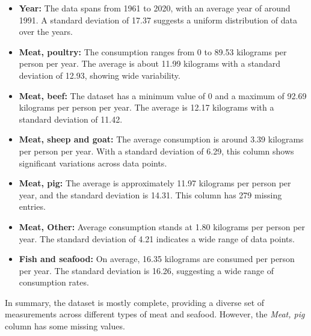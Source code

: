                 \begin{itemize}
                        \item \textbf{Year:} The data spans from 1961 to 2020, with an average year of around 1991. A standard deviation of 17.37 suggests a uniform distribution of data over the years.

                        \item \textbf{Meat, poultry:} The consumption ranges from 0 to 89.53 kilograms per person per year. The average is about 11.99 kilograms with a standard deviation of 12.93, showing wide variability.

                        \item \textbf{Meat, beef:} The dataset has a minimum value of 0 and a maximum of 92.69 kilograms per person per year. The average is 12.17 kilograms with a standard deviation of 11.42.

                        \item \textbf{Meat, sheep and goat:} The average consumption is around 3.39 kilograms per person per year. With a standard deviation of 6.29, this column shows significant variations across data points.

                        \item \textbf{Meat, pig:} The average is approximately 11.97 kilograms per person per year, and the standard deviation is 14.31. This column has 279 missing entries.

                        \item \textbf{Meat, Other:} Average consumption stands at 1.80 kilograms per person per year. The standard deviation of 4.21 indicates a wide range of data points.

                        \item \textbf{Fish and seafood:} On average, 16.35 kilograms are consumed per person per year. The standard deviation is 16.26, suggesting a wide range of consumption rates.
                \end{itemize}

                In summary, the dataset is mostly complete, providing a diverse set of measurements across different types of meat and seafood. However, the \textit{Meat, pig} column has some missing values.


    \section{\dsHappiness}

